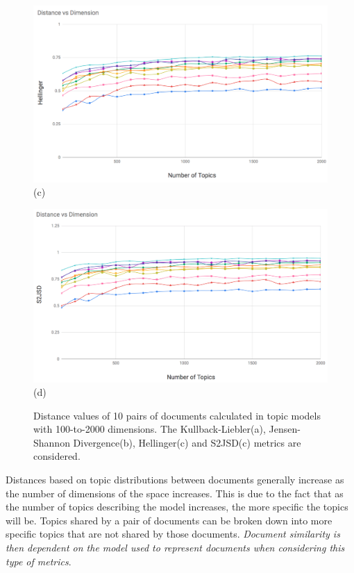 \begin{figure}
\begin{center}
\begin{adjustbox}{minipage=0.50\linewidth,frame=0pt 3pt}
\includegraphics[width=\linewidth]{He_100_2k.png}
\centering (c)
\end{adjustbox}
\hfill
\begin{adjustbox}{minipage=0.50\linewidth,frame=0pt 3pt}
\includegraphics[width=\linewidth]{S2JSD_100_2k.png}
\centering (d)
\end{adjustbox}
\end{center}
\caption{Distance values of 10 pairs of documents calculated in topic models with 100-to-2000 dimensions. The Kullback-Liebler(a), Jensen-Shannon Divergence(b), Hellinger(c) and S2JSD(c) metrics are considered.}
\label{fig:topic_distances}
\end{figure}

Distances based on topic distributions between documents generally increase as the number of dimensions of the space increases. This is due to the fact that as the number of topics describing the model increases, the more specific the topics will be. Topics shared by a pair of documents can be broken down into more specific topics that are not shared by those documents. \textit{Document similarity is then dependent on the model used to represent documents when considering this type of metrics}. 

